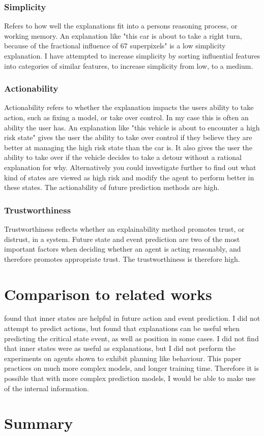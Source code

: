 \documentclass[UKenglish]{uiomasterthesis}
\begin{document}
\subsubsection{Simplicity}
Refers to how well the explanations fit into a persons reasoning process, or working memory. An explanation like "this car is about to take a right turn, because of the fractional influence of 67 superpixels" is a low simplicity explanation. I have attempted to increase simplicity by sorting influential features into categories of similar features, to increase simplicity from low, to a medium. 

\subsubsection{Actionability}
Actionability refers to whether the explanation impacts the users ability to take action, such as fixing a model, or take over control. In my case this is often an ability the user has. An explanation like "this vehicle is about to encounter a high risk state" gives the user the ability to take over control if they believe they are better at managing the high risk state than the car is. It also gives the user the ability to take over if the vehicle decides to take a detour without a rational explanation for why. Alternatively you could investigate further to find out what kind of states are viewed as high risk and modify the agent to perform better in these states. The actionability of future prediction methods are high.

\subsubsection{Trustworthiness}
Trustworthiness reflects whether an explainability method promotes trust, or distrust, in a system. Future state and event prediction are two of the most important factors when deciding whether an agent is acting reasonably, and therefore promotes appropriate trust. The trustworthiness is therefore high.

\section{Comparison to related works}
\cite{chung2024predictingfutureactionsreinforcement} found that inner states are helpful in future action and event prediction. I did not attempt to predict actions, but found that explanations can be useful when predicting the critical state event, as well as position in some cases. I did not find that inner states were as useful as explanations, but I did not perform the experiments on agents shown to exhibit planning like behaviour. This paper practices on much more complex models, and longer training time. Therefore it is possible that with more complex prediction models, I would be able to make use of the internal information.

\section{Summary}



\printbibliography{}
\end{document}
